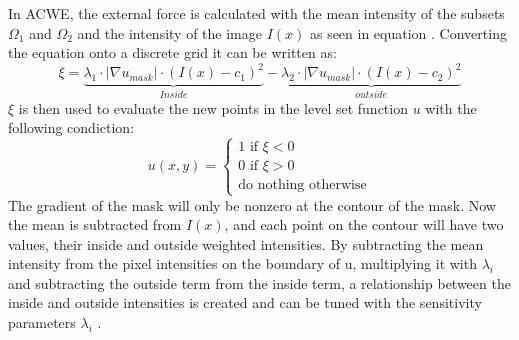 In ACWE, the external force is calculated with the mean intensity of the subsets $\Omega_1$ and $\Omega_2$ and the intensity of the image $I(x)$ as seen in equation . Converting the equation onto a discrete grid it can be written as: 
\begin{equation}
   \xi  = \underbrace{\lambda_{1} \cdot | \nabla u_{mask}| \cdot (I(x)-c_{1})^{2}}_{Inside}-\underbrace{\lambda_{2} \cdot|\nabla u_{mask}| \cdot (I(x)-c_{2})^{2}}_{outside}
\end{equation} 
$\xi$ is then used to evaluate the new points in the level set function $u$ with the following condiction:
\begin{equation}
    u(x,y) = \begin{cases}
        1 \text{ if } \xi<0 \\
        0 \text{ if } \xi>0 \\
        \text{do nothing otherwise}
        \end{cases}
\end{equation}
The gradient of the mask will only be nonzero at the contour of the mask. 
Now the mean is subtracted from $I(x)$, and each point on the contour will have two values, their inside and outside weighted intensities. By subtracting the mean intensity from the pixel intensities on the boundary of u, multiplying it with $\lambda_i$ and subtracting the outside term from the inside term, a relationship between the inside and outside intensities is created and can be tuned with the sensitivity parameters $\lambda_i$ . 

